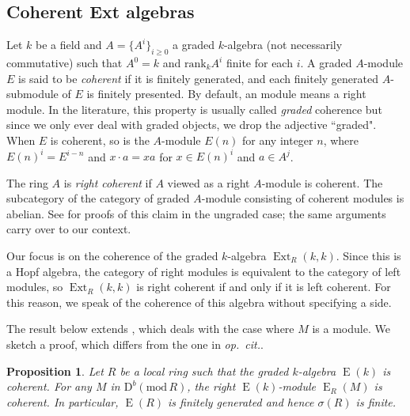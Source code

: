 \documentclass{amsart}
\numberwithin{equation}{section}
\theoremstyle{plain}
\newtheorem{proposition}[equation]{Proposition}
\theoremstyle{definition}
\theoremstyle{remark}
\newcommand{\dbcat}[1]{\mathrm{D}^b(\mathrm{mod}\,{#1})}
\newcommand{\eee}{\operatorname{E}}
\newcommand{\ext}{\operatorname{Ext}}
\newcommand{\rank}{\mathrm{rank}}
\begin{document}
\subsection*{Coherent Ext algebras}
Let $k$ be a field and $A=\{A^i\}_{i\geqslant 0}$ a graded $k$-algebra (not necessarily commutative) such that $A^0=k$ and $\rank_k A^i$ finite for each $i$. 
A graded $A$-module $E$ is said to be \emph{coherent} if it is finitely generated, and each finitely generated $A$-submodule of $E$ is finitely presented.
By default, an module means a right module. In the literature, this property is usually called  \emph{graded} coherence but since we only ever deal with graded objects, we drop the adjective ``graded". When $E$ is coherent, so is the $A$-module $E(n)$ for any integer $n$, where $E(n)^i=E^{i-n}$ and $x\cdot a= xa$ for $x\in E(n)^i$ and $a\in A^j$.

The ring $A$ is \emph{right coherent} if $A$ viewed as a right $A$-module is coherent. The subcategory of the category of graded $A$-module consisting of coherent modules is abelian.  See \cite[\href{https://stacks.math.columbia.edu/tag/05CU}{Tag 05CU}]{stacks-project} for proofs of this claim in the ungraded case; the same arguments carry over to our context. 

Our focus is on the coherence of the graded $k$-algebra $\ext_R(k,k)$. Since this is a Hopf algebra, the category of right modules is equivalent to the category of left modules, so $\ext_R(k,k)$ is right coherent if and only if it is left coherent. For this reason,  we speak of the coherence of this algebra without specifying a side.

The result below extends \cite[Theorem~1']{Roos:1978s}, which deals with the case where $M$ is a module. We sketch a proof, which differs from the one in \emph{op.~cit.}. 

\begin{proposition}
\label{pr:coherent}
    Let  $R$ be a local ring such that the graded $k$-algebra $\eee(k)$ is coherent. For any $M$ in $\dbcat R$, the right $\eee(k)$-module $\eee_R(M)$ is coherent. In particular, $\eee(R)$ is finitely generated and hence $\sigma(R)$ is finite.
\end{proposition}
\end{document}
